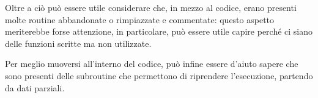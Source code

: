 Oltre a ciò può essere utile considerare che, in mezzo al codice, erano
presenti molte routine abbandonate o rimpiazzate e commentate: questo 
aspetto meriterebbe forse attenzione, in particolare, può essere utile
capire perché ci siano delle funzioni scritte ma non utilizzate.

Per meglio muoversi all'interno del codice, può infine essere d'aiuto
sapere che sono presenti delle subroutine che permettono di riprendere 
l'esecuzione, partendo da dati parziali.
